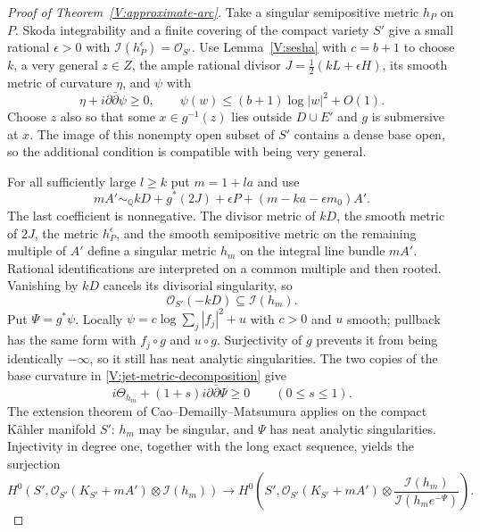 \begin{proof}[Proof of Theorem~\ref{V:approximate-arc}]
Take a singular semipositive metric $h_P$ on $P$.  Skoda integrability
and a finite covering of the compact variety $S'$ give a small
rational $\epsilon>0$ with
$\mathcal I(h_P^\epsilon)=\mathcal O_{S'}$.
Use Lemma~\ref{V:sesha} with $c=b+1$ to choose $k$, a very general
$z\in Z$, the ample rational divisor
$J=\tfrac12(kL+\epsilon H)$, its smooth metric of curvature $\eta$,
and $\psi$ with
\[
 \eta+i\partial\bar\partial\psi\ge0,
 \qquad\psi(w)\le(b+1)\log|w|^2+O(1).
\]
Choose $z$ also so that some $x\in g^{-1}(z)$ lies outside $D\cup E'$
and $g$ is submersive at $x$.  The image of this nonempty open subset
of $S'$ contains a dense base open, so the additional condition is
compatible with being very general.

For all sufficiently large $l\ge k$ put $m=1+la$ and use
\begin{equation}\label{V:jet-metric-decomposition}
 mA'\sim_{\mathbb Q}
 kD+g^*(2J)+\epsilon P+(m-ka-\epsilon m_0)A'.
\end{equation}
The last coefficient is nonnegative.  The divisor metric of $kD$,
the smooth metric of $2J$, the metric $h_P^\epsilon$, and the smooth
semipositive metric on the remaining multiple of $A'$ define a
singular metric $h_m$ on the integral line bundle $mA'$.  Rational
identifications are interpreted on a common multiple and then rooted.
Vanishing by $kD$ cancels its divisorial singularity, so
\[
 \mathcal O_{S'}(-kD)\subseteq\mathcal I(h_m).
\]
Put $\Psi=g^*\psi$.  Locally $\psi=c\log\sum_j|f_j|^2+u$
with $c>0$ and $u$ smooth; pullback has the same form with
$f_j\circ g$ and $u\circ g$.  Surjectivity of $g$ prevents it
from being identically $-\infty$, so it still has neat analytic
singularities.  The two copies of the base curvature in
\eqref{V:jet-metric-decomposition} give
\[
 i\Theta_{h_m}+(1+s)i\partial\bar\partial\Psi\ge0
 \qquad(0\le s\le1).
\]
The extension theorem of Cao--Demailly--Matsumura
\cite[Theorem~1.1]{CDM2017} applies on the compact K\"ahler manifold
$S'$: $h_m$ may be singular, and $\Psi$ has neat analytic
singularities.  Injectivity in degree one, together with the long
exact sequence, yields the surjection
\begin{equation}\label{V:quotient-surjection}
 H^0\!\left(S',\mathcal O_{S'}(K_{S'}+mA')\otimes\mathcal I(h_m)\right)
 \longrightarrow
 H^0\!\left(S',\mathcal O_{S'}(K_{S'}+mA')\otimes
 \frac{\mathcal I(h_m)}{\mathcal I(h_me^{-\Psi})}\right).
\end{equation}


\end{proof}
